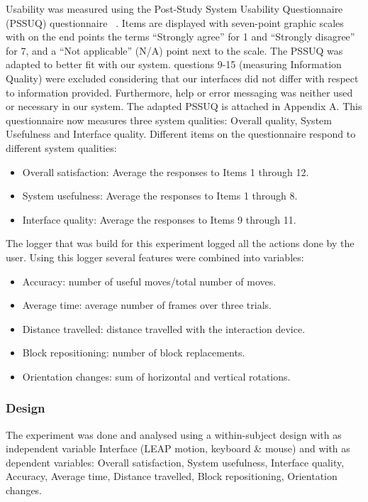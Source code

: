 Usability was measured using the Post-Study System Usability Questionnaire (PSSUQ) questionnaire ~\cite{lewis1992psychometric}. Items are displayed with seven-point graphic scales with on the end points the terms “Strongly agree” for 1 and “Strongly disagree” for 7, and a “Not applicable” (N/A) point next to the scale. The PSSUQ was adapted to better fit with our system. questions 9-15 (measuring Information Quality) were excluded considering that our interfaces did not differ with respect to information provided. Furthermore, help or error messaging was neither used or necessary in our system. The adapted PSSUQ is attached in Appendix A. This questionnaire now measures three system qualities: Overall quality, System Usefulness and Interface quality.  Different items on the questionnaire respond to different system qualities:
\begin{itemize}
	\item Overall satisfaction: Average the responses to Items 1 through 12.
	\item System usefulness: Average the responses to Items 1 through 8.
    \item Interface quality: Average the responses to Items 9 through 11.
\end{itemize}

The logger that was build for this experiment logged all the actions done by the user. Using this logger several features were combined into variables: 
\begin{itemize}
	\item Accuracy: number of useful moves/total number of moves.
	\item Average time: average number of frames over three trials.    
	\item Distance travelled: distance travelled with the interaction device.
    \item Block repositioning: number of block replacements.
    \item Orientation changes: sum of horizontal and vertical rotations.
\end{itemize}


\subsubsection{Design}
The experiment was done and analysed using a within-subject design with as independent variable Interface (LEAP motion, keyboard \& mouse) and with as dependent variables: Overall satisfaction, System usefulness, Interface quality, Accuracy, Average time, Distance travelled, Block repositioning, Orientation changes. 

